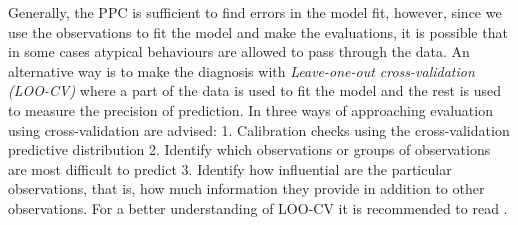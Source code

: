Generally, the PPC is sufficient to find errors in the model fit, however, since we use the observations to fit the model and make the evaluations, it is possible that in some cases atypical behaviours are allowed to pass through the data. An alternative way is to make the diagnosis with \textit{Leave-one-out cross-validation (LOO-CV)} where a part of the data is used to fit the model and the rest is used to measure the precision of prediction. In \cite{Aki} three ways of approaching evaluation using cross-validation are advised: 1. Calibration checks using the cross-validation predictive distribution 2. Identify which observations or groups of observations are most difficult to predict 3. Identify how influential are the particular observations, that is, how much information they provide in addition to other observations. For a better understanding of LOO-CV it is recommended to read \citet{waic}.
%
